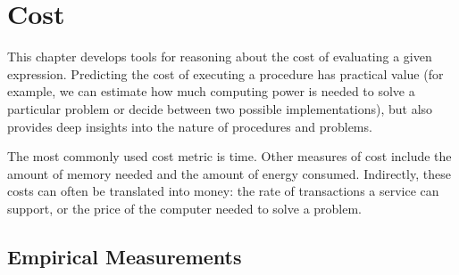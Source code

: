 \chapter{Cost}\label{ch:cost}\label{ch:resources}

\begin{schemeregion}

This chapter develops tools for reasoning about the cost of evaluating a given expression.  Predicting the cost of executing a procedure has practical value (for example, we can estimate how much computing power is needed to solve a particular problem or decide between two possible implementations), but also provides deep insights into the nature of procedures and problems.

The most commonly used cost metric is time.  Other measures of cost include the amount of memory needed and the amount of energy consumed.  Indirectly, these costs can often be translated into money: the rate of transactions a service can support, or the price of the computer needed to solve a problem.  


\section{Empirical Measurements}\label{sec:measuringcost}


\end{schemeregion}
